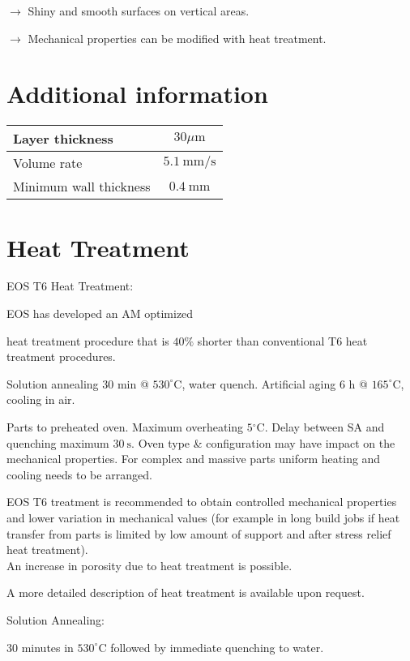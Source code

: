 \documentclass[10pt]{article}
\begin{document}
$\longrightarrow$ Shiny and smooth surfaces on vertical areas.

$\longrightarrow$ Mechanical properties can be modified with heat treatment.

\section*{Additional information}
\begin{center}
\begin{tabular}{lc}
\hline
Layer thickness & $30 \mu \mathrm{m}$ \\
\hline
Volume rate & $5.1 \mathrm{~mm} / \mathrm{s}$ \\
\hline
Minimum wall thickness & $0.4 \mathrm{~mm}$ \\
\hline
\end{tabular}
\end{center}

\section*{Heat Treatment}
EOS T6 Heat Treatment:

EOS has developed an AM optimized

heat treatment procedure that is $40 \%$ shorter than conventional T6 heat treatment procedures.

Solution annealing 30 min @ $530^{\circ} \mathrm{C}$, water quench. Artificial aging 6 h @ $165^{\circ} \mathrm{C}$, cooling in air.

Parts to preheated oven. Maximum overheating $5{ }^{\circ} \mathrm{C}$. Delay between SA and quenching maximum $30 \mathrm{~s}$. Oven type \& configuration may have impact on the mechanical properties. For complex and massive parts uniform heating and cooling needs to be arranged.

EOS T6 treatment is recommended to obtain controlled mechanical properties and lower variation in mechanical values (for example in long build jobs if heat transfer from parts is limited by low amount of support and after stress relief heat treatment).\\
An increase in porosity due to heat treatment is possible.

A more detailed description of heat treatment is available upon request.

Solution Annealing:

30 minutes in $530^{\circ} \mathrm{C}$ followed by immediate quenching to water.
\end{document}
